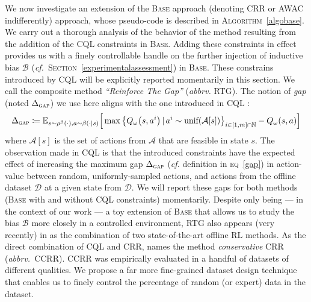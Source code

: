 We now investigate an extension of
the \textsc{Base} approach (denoting CRR
or AWAC indifferently) approach,
whose pseudo-code is described in \textsc{Algorithm}~\ref{algobase}.
We carry out a thorough analysis of the behavior of the method resulting from the addition of
the CQL \cite{Kumar2020-zb} constraints in \textsc{Base}.
Adding these constraints in effect provides us with a finely controllable handle on the further
injection of inductive bias $\mathcal{B}$
(\textit{cf.}~\textsc{Section}~\ref{experimentalassessment}) in \textsc{Base}.
These constrains introduced by CQL will be explicitly reported momentarily in this section.
We call the composite method \textit{``Reinforce The Gap''} (\textit{abbrv.} RTG).
The notion of \textit{gap} (noted $\Delta_\textsc{gap}$) we use here aligns with the one introduced in
CQL \cite{Kumar2020-zb}:
\begin{align}
  \Delta_\textsc{gap} \coloneqq
  \mathbb{E}_{s \sim \rho^\beta(\cdot), a \sim \beta(\cdot | s)}
  \Big[
  \max
  \big\{
  Q_\omega\big(s, a^i\big) \, | \, a^i \sim \text{unif}(\mathcal{A}[s])
  \big\}_{i \in [1,m] \cap \mathbb{N}}
  - Q_\omega(s,a)
  \Big]
  \label{gap}
\end{align}
where $\mathcal{A}[s]$ is the set of actions from $\mathcal{A}$ that are feasible in state $s$.
The observation made in CQL is that the introduced constraints have the expected effect of
increasing the maximum gap $\Delta_\textsc{gap}$ (\textit{cf.} definition in \textsc{eq}~\ref{gap})
in action-value between random, uniformly-sampled actions, and actions from
the offline dataset $\mathcal{D}$
at a given state from $\mathcal{D}$.
We will report these gaps for both methods (\textsc{Base} with and without CQL constraints) momentarily.
Despite only being ---
in the context of our work ---
a toy extension of \textsc{Base} that allows us to study the bias $\mathcal{B}$
more closely in a controlled environment,
RTG also appears (very recently) in \cite{Monier2020-tq}
as the combination of two state-of-the-art offline RL methods.
As the direct combination of CQL and CRR,
\cite{Monier2020-tq} names the method \textit{conservative} CRR (\textit{abbrv.}~CCRR).
CCRR was empirically evaluated in a handful of datasets of different qualities.
We propose a far more fine-grained dataset design technique that enables us to finely control the percentage
of random (or expert) data in the dataset.

